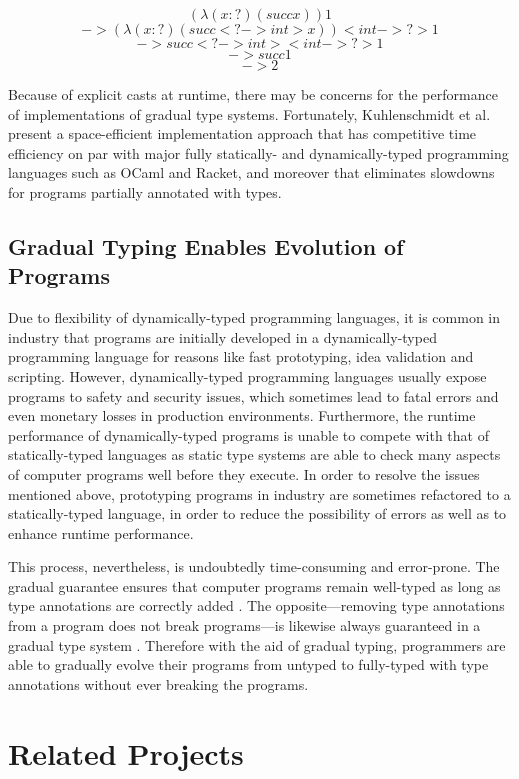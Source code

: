 \[(\lambda (x : ?) (succ x)) 1\]
\[-> (\lambda (x : ?) (succ <?->int>x)) <int->?>1\]
\[-> succ <?->int><int->?>1\]
\[-> succ 1\]
\[-> 2\]

Because of explicit casts at runtime, there may be concerns for the performance of implementations of gradual type systems. Fortunately, Kuhlenschmidt et al. \cite{kuhlenschmidt2018efficient} present a space-efficient implementation approach that has competitive time efficiency on par with major fully statically- and dynamically-typed programming languages such as OCaml and Racket, and moreover that eliminates slowdowns for programs partially annotated with types.

\subsection{Gradual Typing Enables Evolution of Programs}
Due to flexibility of dynamically-typed programming languages, it is common in industry that programs are initially developed in a dynamically-typed programming language for reasons like fast prototyping, idea validation and scripting. However, dynamically-typed programming languages usually expose programs to safety and security issues, which sometimes lead to fatal errors and even monetary losses in production environments. Furthermore, the runtime performance of dynamically-typed programs is unable to compete with that of statically-typed languages as static type systems are able to check many aspects of computer programs well before they execute. In order to resolve the issues mentioned above, prototyping programs in industry are sometimes refactored to a statically-typed language, in order to reduce the possibility of errors as well as to enhance runtime performance.

This process, nevertheless, is undoubtedly time-consuming and error-prone. The gradual guarantee ensures that computer programs remain well-typed as long as type annotations are correctly added \cite{siek2015refined}. The opposite---removing type annotations from a program does not break programs---is likewise always guaranteed in a gradual type system \cite{siek2015refined}. Therefore with the aid of gradual typing, programmers are able to gradually evolve their programs from untyped to fully-typed with type annotations without ever breaking the programs.

\section{Related Projects}
